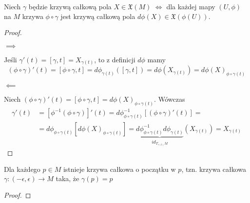 \begin{lemma}\label{lemat:5.10}
  Niech $\gamma$ będzie krzywą całkową pola $X\in\mathfrak{X}(M)$ $\iff$ dla każdej mapy $(U,\phi)$ na $M$ krzywa $\phi\circ\gamma$ jest krzywą całkową pola $d\phi(X)\in\mathfrak{X}(\phi(U))$.
\end{lemma}

\begin{proof}$ $\newline

  $\implies$

  Jeśli $\gamma'(t)=[\gamma,t]=X_{\gamma(t)}$, to z definicji $d\phi$ mamy 
\reversemarginpar{}
  $$(\phi\circ\gamma)'(t)=[\phi\circ\gamma,t]=d\phi_{\gamma(t)}([\gamma,t])=d\phi(X_{\gamma(t)})=d\phi(X)_{\phi\circ\gamma(t)}$$

  $\impliedby$

  Niech $(\phi\circ\gamma)'(t)=[\phi\circ\gamma,t]=d\phi(X)_{\phi\circ\gamma(t)}$. Wówczas
  \begin{align*}
    \gamma'(t)&=[\phi^{-1}(\phi\circ\gamma)]'(t)=d\phi^{-1}_{ \phi\circ\gamma(t)}[ (\phi\circ\gamma)'(t)]=\\
              &=d\phi_{\phi\circ\gamma(t)}[d\phi(X)_{\phi\circ\gamma(t)}]= \underbrace{d\phi^{-1}_{\phi\circ\gamma(t)}d\phi_{\gamma(t)}}_{id_{T_{\gamma(t)}M}}(X_{\gamma(t)})=X_{\gamma(t)}
  \end{align*}
\end{proof}

\begin{theorem} Dla każdego $p\in M$ istnieje krzywa całkowa o początku w $p$, tzn. krzywa całkowa $\gamma:(-\epsilon,\epsilon)\to M$ taka, że $\gamma(p)=p$
\end{theorem}

\begin{proof}
\end{proof}
